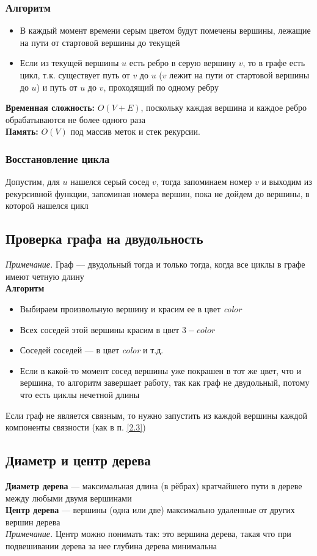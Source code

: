 \documentclass[a4paper]{article}
\begin{document}
\subsubsection*{Алгоритм}
\begin{itemize}
    \item В каждый момент времени серым цветом будут помечены вершины, лежащие на пути \dfs от стартовой вершины до текущей
    \item Если из текущей вершины $u$ есть ребро в серую вершину $v$, то в графе есть цикл, т.к. существует путь от $v$ до $u$ ($v$ лежит на пути от стартовой вершины до $u$) и путь от $u$ до $v$, проходящий по одному ребру
\end{itemize}
\textbf{Временная сложность:} $O(V + E)$, поскольку каждая вершина и каждое ребро обрабатываются не более одного раза\\[2mm]
\textbf{Память:} $O(V)$ под массив меток и стек рекурсии.
\subsubsection*{Восстановление цикла}
Допустим, для $u$ нашелся серый сосед $v$, тогда запоминаем номер $v$ и выходим из рекурсивной функции, запоминая номера вершин, пока не дойдем до вершины, в которой нашелся цикл 
 
\subsection{Проверка графа на двудольность}
\textit{Примечание.} Граф — двудольный тогда и только тогда, когда все циклы в графе имеют четную длину\\[2mm]
\textbf{Алгоритм}
\begin{itemize}
    \item Выбираем произвольную вершину и красим ее в цвет \textit{color}
    \item Всех соседей этой вершины красим в цвет $3-color$
    \item Соседей соседей — в цвет \textit{color} и т.д.
    \item Если в какой-то момент сосед вершины уже покрашен в тот же цвет, что и вершина, то алгоритм завершает работу, так как граф не двудольный, потому что есть циклы нечетной длины
\end{itemize}
Если граф не является связным, то нужно запустить \dfs из каждой вершины каждой компоненты связности (как в п. \ref{2.3})


\subsection{Диаметр и центр дерева}
\textbf{Диаметр дерева} — максимальная длина (в рёбрах) кратчайшего пути в дереве между любыми двумя вершинами\\[2mm]
\indent\textbf{Центр дерева} — вершины (одна или две) максимально удаленные от других вершин дерева\\
\indent\indent\textit{Примечание.} Центр можно понимать так: это вершина дерева, такая что при подвешивании дерева за нее глубина дерева минимальна
\end{document}
